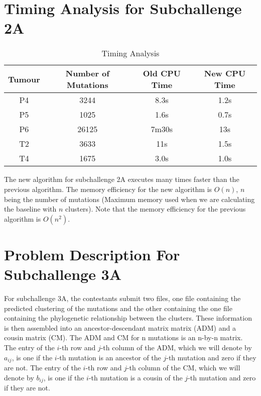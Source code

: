 \documentclass[a4paper, 11pt]{article}
\begin{document}
\section*{Timing Analysis for Subchallenge 2A}

\begin{center}
    \begin{table}[H]
    \centering
    \begin{tabular}{c c c c}
    \hline
    Tumour & Number of Mutations & Old CPU Time & New CPU Time\\  
    \hline\hline
    P4 & 3244 & 8.3s & 1.2s\\
    \hline
    P5 & 1025 & 1.6s & 0.7s\\
    \hline
    P6 & 26125 & 7m30s & 13s\\ 
    \hline
    T2 & 3633 & 11s & 1.5s\\
    \hline
    T4 & 1675 & 3.0s & 1.0s\\
    \hline
    \end{tabular}
    \caption{Timing Analysis}
    \label{table:om}
    \end{table}
\end{center}

The new algorithm for subchallenge 2A executes many times faster than the previous algorithm. The memory efficiency for the new algorithm is $O(n)$, $n$ being the number of mutations (Maximum memory used when we are calculating the baseline with $n$ clusters). Note that the memory efficiency for the previous algorithm is $O(n^2)$.  

\section*{Problem Description For Subchallenge 3A}
For subchallenge 3A, the contestants submit two files, one file containing the predicted clustering of the mutations and the other containing the one file containing the phylogenetic relationship between the clusters. These information is then assembled into an ancestor-descendant matrix matrix (ADM) and a cousin matrix (CM). The ADM and CM for n mutations is an n-by-n matrix. The entry of the $i$-th row and $j$-th column of the ADM, which we will denote by $a_{ij}$, is one if the $i$-th mutation is an ancestor of the $j$-th mutation and zero if they are not. The entry of the $i$-th row and $j$-th column of the CM, which we will denote by $b_{ij}$, is one if the $i$-th mutation is a cousin of the $j$-th mutation and zero if they are not. 
\end{document}
